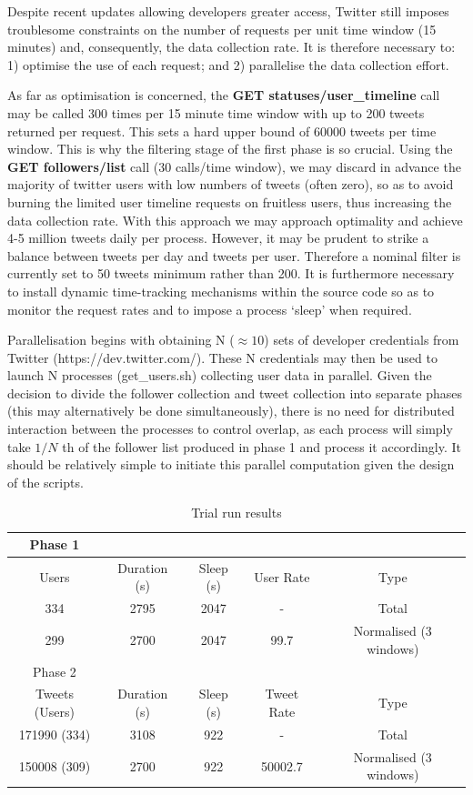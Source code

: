 Despite recent updates allowing developers greater access, Twitter still imposes troublesome constraints on the number of requests per unit time window (15 minutes) and, consequently, the data collection rate. It is therefore necessary to: 1) optimise the use of each request; and 2) parallelise the data collection effort.

As far as optimisation is concerned, the \textbf{GET statuses/user\_timeline} call may be called 300 times per 15 minute time window with up to 200 tweets returned per request. This sets a hard upper bound of 60000 tweets per time window. This is why the filtering stage of the first phase is so crucial. Using the \textbf{GET followers/list} call (30 calls/time window), we may discard in advance the majority of twitter users with low numbers of tweets (often zero), so as to avoid burning the limited user timeline requests on fruitless users, thus increasing the data collection rate. With this approach we may approach optimality and achieve 4-5 million tweets daily per process. However, it may be prudent to strike a balance between tweets per day and tweets per user. Therefore a nominal filter is currently set to 50 tweets minimum rather than 200. It is furthermore necessary to install dynamic time-tracking mechanisms within the source code so as to monitor the request rates and to impose a process `sleep' when required.

Parallelisation begins with obtaining N ($\approx 10$) sets of developer credentials from Twitter (https://dev.twitter.com/). These N credentials may then be used to launch N processes (get\_users.sh) collecting user data in parallel. Given the decision to divide the follower collection and tweet collection into separate phases (this may alternatively be done simultaneously), there is no need for distributed interaction between the processes to control overlap, as each process will simply take $1/N$ th of the follower list produced in phase 1 and process it accordingly. It should be relatively simple to initiate this parallel computation given the design of the scripts.

\begin{table}
\begin{center}
\begin{tabular}{ | c | c | c | c | c | }
\hline
Phase 1  \\ \hline
Users & Duration (s) & Sleep (s) & User Rate & Type \\ \hline
334 & 2795 & 2047 & - & Total \\ \hline
299 & 2700 & 2047 & 99.7 & Normalised (3 windows) \\ \hline
Phase 2 \\ \hline
Tweets (Users) & Duration (s) & Sleep (s) & Tweet Rate & Type \\ \hline
171990 (334) & 3108 & 922 & - & Total \\ \hline
150008 (309) & 2700 & 922 & 50002.7 &  Normalised (3 windows) \\ \hline
\end{tabular}
\end{center}
\caption{Trial run results}
\label{table:benchmark}
\end{table}

